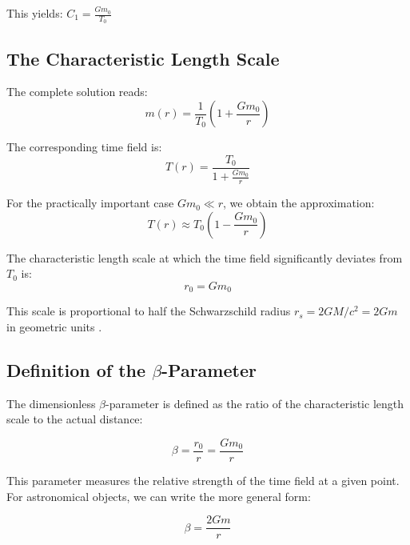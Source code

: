 \documentclass[12pt,a4paper]{article}
\begin{document}
	This yields: $C_1 = \frac{G m_0}{T_0}$
	
	\subsection{The Characteristic Length Scale}
	\label{subsec:characteristic_length}
	
	The complete solution reads:
	\begin{equation}
		m(r) = \frac{1}{T_0}\left(1 + \frac{G m_0}{r}\right)
	\end{equation}
	
	The corresponding time field is:
	\begin{equation}
		T(r) = \frac{T_0}{1 + \frac{G m_0}{r}}
	\end{equation}
	
	For the practically important case $G m_0 \ll r$, we obtain the approximation:
	\begin{equation}
		T(r) \approx T_0\left(1 - \frac{G m_0}{r}\right)
	\end{equation}
	
	The characteristic length scale at which the time field significantly deviates from $T_0$ is:
	\begin{equation}
		\boxed{r_0 = G m_0}
	\end{equation}
	
	This scale is proportional to half the Schwarzschild radius $r_s = 2GM/c^2 = 2Gm$ in geometric units \citep{misner1973,carroll2004}.
	
	\subsection{Definition of the $\beta$-Parameter}
	\label{subsec:beta_definition}
	
	The dimensionless $\beta$-parameter is defined as the ratio of the characteristic length scale to the actual distance:
	
	\begin{equation}
		\boxed{\beta = \frac{r_0}{r} = \frac{G m_0}{r}}
	\end{equation}
	
	This parameter measures the relative strength of the time field at a given point. For astronomical objects, we can write the more general form:
	
	\begin{equation}
		\boxed{\beta = \frac{2Gm}{r}}
	\end{equation}
	
\end{document}
